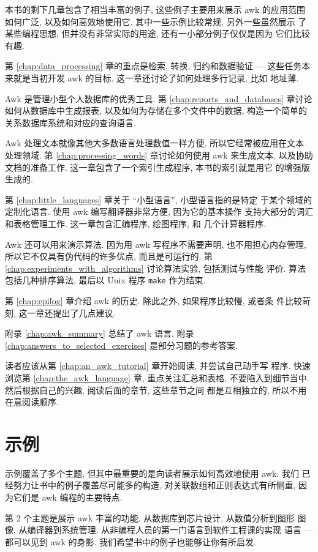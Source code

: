 本书的剩下几章包含了相当丰富的例子, 这些例子主要用来展示 awk 的应用范围
如何广泛, 以及如何高效地使用它. 其中一些示例比较常规, 另外一些虽然展示
了某些编程思想, 但并没有非常实际的用途, 还有一小部分例子仅仅是因为
它们比较有趣.

第 \ref{chap:data_processing} 章的重点是检索, 转换, 归约和数据验证  ---
这些任务本来就是当初开发 awk 的目标. 这一章还讨论了如何处理多行记录, 比如
地址薄.

Awk 是管理小型个人数据库的优秀工具. 第 \ref{chap:reports_and_databases}
章讨论如何从数据库中生成报表, 以及如何为存储在多个文件中的数据, 
构造一个简单的关系数据库系统和对应的查询语言.

Awk 处理文本就像其他大多数语言处理数值一样方便, 所以它经常被应用在文本
处理领域. 第 \ref{chap:processing_words} 章讨论如何使用 awk 来生成文本,
以及协助文档的准备工作. 这一章包含了一个索引生成程序, 本书的索引就是用它
的增强版生成的.

第 \ref{chap:little_languages} 章关于 ``小型语言'', 小型语言指的是特定
于某个领域的定制化语言. 使用 awk 编写翻译器非常方便, 因为它的基本操作
支持大部分的词汇和表格管理工作. 这一章包含汇编程序, 绘图程序, 和
几个计算器程序.

Awk 还可以用来演示算法. 因为用 awk 写程序不需要声明, 也不用担心内存管理,
所以它不仅具有伪代码的许多优点, 而且是可运行的. 第
\ref{chap:experiments_with_algorithms} 讨论算法实验, 包括测试与性能
评价. 算法包括几种排序算法, 最后以 Unix 程序 \texttt{make} 作为结束.

第 \ref{chap:epilog} 章介绍 awk 的历史. 除此之外, 如果程序比较慢, 或者条
件比较苛刻, 这一章还提出了几点建议.

附录 \ref{chap:awk_summary} 总结了 awk 语言, 附录
\ref{chap:answers_to_selected_exercises} 是部分习题的参考答案.

读者应该从第 \ref{chap:an_awk_tutorial} 章开始阅读, 并尝试自己动手写
程序. 快速浏览第 \ref{chap:the_awk_language} 章, 重点关注汇总和表格,
不要陷入到细节当中. 然后根据自己的兴趣, 阅读后面的章节, 这些章节之间
都是互相独立的, 所以不用在意阅读顺序.
\section*{示例}
示例覆盖了多个主题, 但其中最重要的是向读者展示如何高效地使用 awk. 我们
已经努力让书中的例子覆盖尽可能多的构造, 对关联数组和正则表达式有所侧重,
因为它们是 awk 编程的主要特点.

第 2 个主题是展示 awk 丰富的功能. 从数据库到芯片设计, 从数值分析到图形
图像, 从编译器到系统管理, 从非编程人员的第一门语言到软件工程课的实现
语言 --- 都可以见到 awk 的身影. 我们希望书中的例子也能够让你有所启发.

